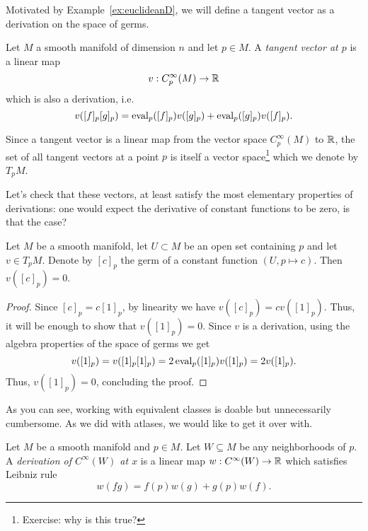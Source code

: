 Motivated by Example~\ref{ex:euclideanD}, we will define a tangent vector as a derivation on the space of germs.

\begin{definition}
  Let $M$ a smooth manifold of dimension $n$ and let $p\in M$.
  A \emph{tangent vector at $p$} is a linear map
  \begin{equation}\label{def:tangentvector}
    v: C_p^\infty(M)\to\mathbb{R}
  \end{equation}
  which is also a derivation, i.e.
  \begin{equation}
    v([f]_p [g]_p) =
      \operatorname{eval}_p([f]_p)v([g]_p)
      + \operatorname{eval}_p([g]_p)v([f]_p).
  \end{equation}

  Since a tangent vector is a linear map from the vector space $C_p^\infty(M)$ to $\mathbb{R}$, the set of all tangent vectors at a point $p$ is itself a vector space\footnote{Exercise: why is this true?} which we denote by $T_p M$.
\end{definition}

Let's check that these vectors, at least satisfy the most elementary properties of derivations: one would expect the derivative of constant functions to be zero, is that the case?

\begin{lemma}\label{lem:f'0is0forconst}
  Let $M$ be a smooth manifold, let $U\subset M$ be an open set containing $p$ and let $v\in T_p M$.
  Denote by $[c]_p$ the germ of a constant function $(U, p \mapsto c)$.
  Then $v([c]_p) = 0$.
\end{lemma}
\begin{proof}
  Since $[c]_p = c [1]_p$, by linearity we have $v([c]_p) = c v([1]_p)$.
  Thus, it will be enough to show that $v([1]_p) = 0$.
  Since $v$ is a derivation, using the algebra properties of the space of germs we get
  \begin{equation}
    v([1]_p) = v([1]_p [1]_p) = 2 \operatorname{eval}_p([1]_p)v([1]_p) = 2 v([1]_p).
  \end{equation}
  Thus, $v([1]_p) = 0$, concluding the proof.
\end{proof}

As you can see, working with equivalent classes is doable but unnecessarily cumbersome. As we did with atlases, we would like to get it over with.

\begin{definition}
  Let $M$ be a smooth manifold and $p\in M$.
  Let $W\subseteq M$ be any neighborhoods of $p$.
  A \emph{derivation of $C^\infty(W)$ at $x$} is a linear map $w:C^\infty(W)\to\mathbb{R}$ which satisfies Leibniz rule
  \begin{equation}
    w(fg) = f(p)w(g) + g(p)w(f).
  \end{equation}
\end{definition}

